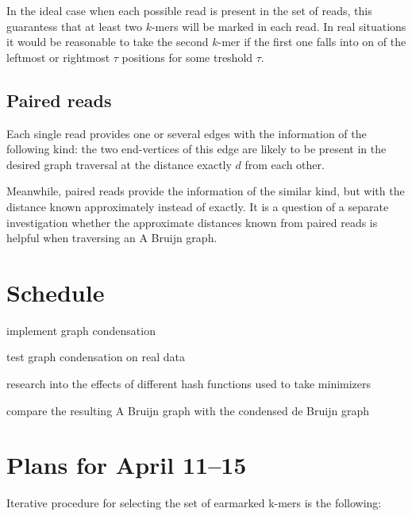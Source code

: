 \documentclass[12pt]{article}
\begin{document}
In the ideal case when each possible read is present in the set of reads, this guarantess that
at least two $k$-mers will be marked in each read.
In real situations it would be reasonable to take the second $k$-mer if the first one
falls into on of the leftmost or rightmost $\tau$ positions for some treshold $\tau$.

\subsection{Paired reads}

Each single read provides one or several edges with the information of the following kind:
the two end-vertices of this edge are likely to be present in the desired graph traversal
at the distance exactly $d$ from each other.

Meanwhile, paired reads provide the information of the similar kind, but with the distance
known approximately instead of exactly.
It is a question of a separate investigation whether the approximate distances known from
paired reads is helpful when traversing an A Bruijn graph.

\section{Schedule}

\begin{description}
  \item[April 10] implement graph condensation
  \item[April 17] test graph condensation on real data
  \item[April 30] research into the effects of different hash functions 
  used to take minimizers
  \item[May 10] compare the resulting A Bruijn graph with the condensed de 
  Bruijn graph
  \item 
\end{description}

\section{Plans for April 11--15}

Iterative procedure for selecting the set of earmarked k-mers is the following:
\end{document}
